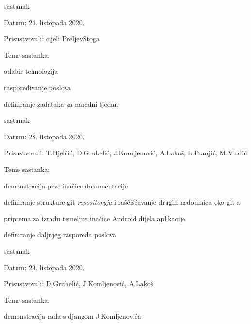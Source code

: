 \begin{packed_enum}
			\item  sastanak
			\item[] \begin{packed_item}
				\item Datum: 24. listopada 2020.
				\item Prisustvovali: cijeli PreljevStoga
				\item Teme sastanka:
				\begin{packed_item}
					\item  odabir tehnologija
					\item  raspoređivanje poslova
					\item  definiranje zadataka za naredni tjedan
				\end{packed_item}
			\end{packed_item}
			
			\item  sastanak
			\item[] \begin{packed_item}
				\item Datum: 28. listopada 2020.
				\item Prisustvovali: T.Bjelčić, D.Grubelić, J.Komljenović, A.Lakoš, L.Pranjić, M.Vladić
				\item Teme sastanka:
				\begin{packed_item}
					\item  demonstracija prve inačice dokumentacije
					\item  definiranje strukture git \textit{repositoryja} i raščišćavanje drugih nedoumica oko git-a
					\item  priprema za izradu temeljne inačice Android dijela aplikacije
					\item  definiranje daljnjeg rasporeda poslova
				\end{packed_item}
			\end{packed_item}
			
			\item  sastanak
			\item[] \begin{packed_item}
				\item Datum: 29. listopada 2020.
				\item Prisustvovali: D.Grubelić, J.Komljenović, A.Lakoš
				\item Teme sastanka:
				\begin{packed_item}
					\item  demonstracija rada s djangom J.Komljenovića
				\end{packed_item}
			\end{packed_item}
			

\end{packed_enum}
